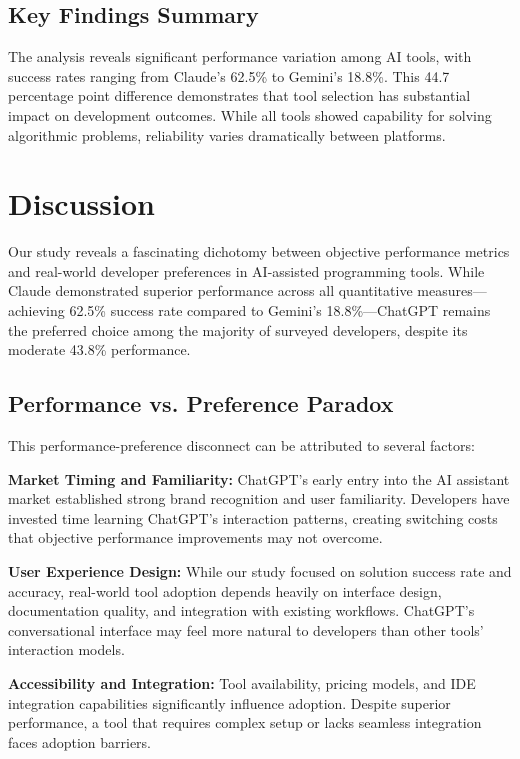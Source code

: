 \documentclass[conference]{IEEEtran}
\begin{document}
\subsection{Key Findings Summary}

The analysis reveals significant performance variation among AI tools, with success rates ranging from Claude's 62.5\% to Gemini's 18.8\%. This 44.7 percentage point difference demonstrates that tool selection has substantial impact on development outcomes. While all tools showed capability for solving algorithmic problems, reliability varies dramatically between platforms.

\section{Discussion}

Our study reveals a fascinating dichotomy between objective performance metrics and real-world developer preferences in AI-assisted programming tools. While Claude demonstrated superior performance across all quantitative measures—achieving 62.5\% success rate compared to Gemini's 18.8\%—ChatGPT remains the preferred choice among the majority of surveyed developers, despite its moderate 43.8\% performance.

\subsection{Performance vs. Preference Paradox}

This performance-preference disconnect can be attributed to several factors:

\textbf{Market Timing and Familiarity:} ChatGPT's early entry into the AI assistant market established strong brand recognition and user familiarity. Developers have invested time learning ChatGPT's interaction patterns, creating switching costs that objective performance improvements may not overcome.

\textbf{User Experience Design:} While our study focused on solution success rate and accuracy, real-world tool adoption depends heavily on interface design, documentation quality, and integration with existing workflows. ChatGPT's conversational interface may feel more natural to developers than other tools' interaction models.

\textbf{Accessibility and Integration:} Tool availability, pricing models, and IDE integration capabilities significantly influence adoption. Despite superior performance, a tool that requires complex setup or lacks seamless integration faces adoption barriers.
\end{document}
